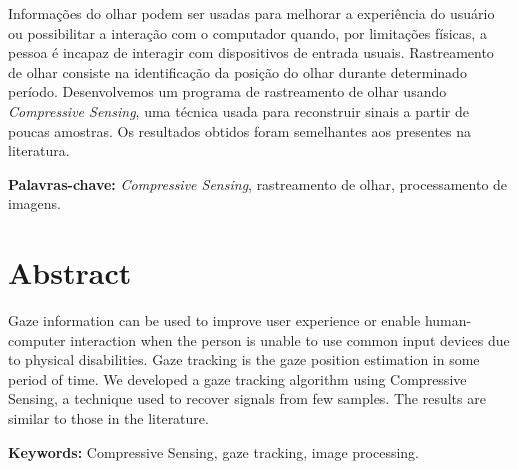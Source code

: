 \documentclass[12pt]{report}
\newcommand{\oldc}[1]{}
\newcommand{\newc}[1]{#1}
\begin{document}
Informações do olhar podem ser usadas para melhorar a experiência do usuário ou possibilitar a interação com o computador quando, por limitações físicas, a pessoa é incapaz de interagir com dispositivos de entrada usuais. Rastreamento de olhar consiste na identificação da posição do olhar durante determinado período. Desenvolvemos um programa de rastreamento de olhar usando \textit{Compressive Sensing}, uma técnica usada para \oldc{recuperar sinais esparsos} \newc{reconstruir sinais a partir de poucas amostras}. Os resultados obtidos foram semelhantes aos presentes na literatura.

\noindent \textbf{Palavras-chave:} \textit{Compressive Sensing}, rastreamento de olhar, processamento de imagens.



\chapter*{Abstract}

Gaze information can be used to improve user experience or enable human-computer interaction when the person is unable to use common input devices due to physical disabilities. Gaze tracking is the gaze position estimation in some period of time.  We developed a gaze tracking algorithm \oldc{with} \newc{using} Compressive Sensing, a technique used to recover \oldc{sparse signals} \newc{signals from few samples}. The results are similar to those in the literature.

\noindent \textbf{Keywords:} Compressive Sensing, gaze tracking, image processing.

\tableofcontents    %









%


\end{document}
